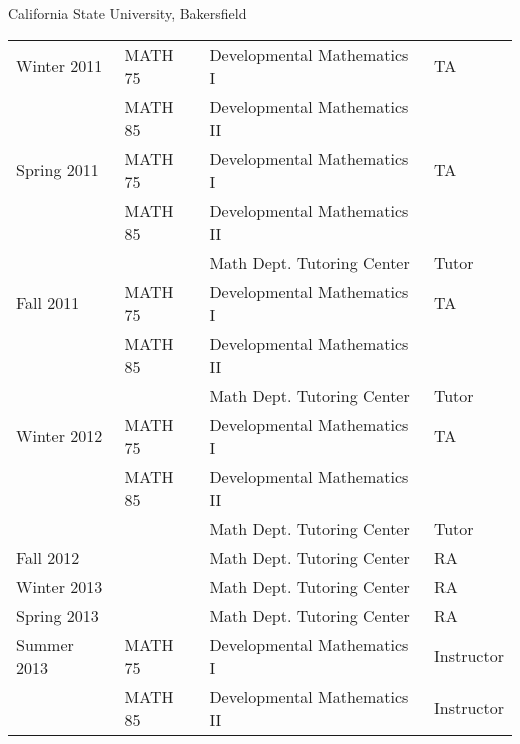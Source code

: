\documentclass{article}
\begin{document}
California State University, Bakersfield
\begin{table}[htp]
\begin{tabular}{llll}
\hline
Winter 2011	& MATH 75  & Developmental Mathematics I  & TA         \\
          	& MATH 85  & Developmental Mathematics II &            \\
Spring 2011	& MATH 75  & Developmental Mathematics I  & TA         \\
          	& MATH 85  & Developmental Mathematics II &            \\
          	&          & Math Dept. Tutoring Center   & Tutor      \\
Fall 2011	  & MATH 75  & Developmental Mathematics I  & TA         \\
          	& MATH 85  & Developmental Mathematics II &            \\
          	&          & Math Dept. Tutoring Center   & Tutor      \\
Winter 2012	& MATH 75  & Developmental Mathematics I  & TA         \\
          	& MATH 85  & Developmental Mathematics II &            \\
          	&          & Math Dept. Tutoring Center   & Tutor      \\
Fall 2012 	&          & Math Dept. Tutoring Center   & RA         \\
Winter 2013	&          & Math Dept. Tutoring Center   & RA         \\
Spring 2013	&          & Math Dept. Tutoring Center   & RA         \\
Summer 2013	& MATH 75  & Developmental Mathematics I  & Instructor \\
          	& MATH 85  & Developmental Mathematics II & Instructor \\
\hline
\end{tabular}
\end{table}

\newpage


\end{document}
